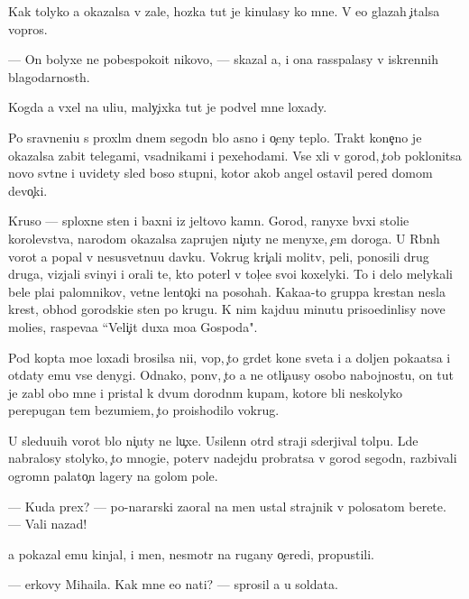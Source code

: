 \documentclass[10pt]{book}
\begin{document}
Kak tolyko {\y}a okazalsa v zale, hoz{\ia}{\y}ka tut je kinulasy ko mne. V {\y}e{\y}o glazah {\c}italsa vopros.

— On bolyxe ne pobespoko{\y}it nikovo, — skazal {\y}a, i ona rass{\yi}palasy v iskrennih blagodarnost{\ia}h.

Kogda {\y}a v{\yi}xel na uli{\q}u, maly{\c}ixka tut je podvel mne loxady.

Po sravneni{\y}u s proxl{\yi}m dnem segodn{\ia} b{\yi}lo {\y}asno i o{\c}eny teplo. Trakt kone{\c}no je okazalsa zabit telegami, vsadnikami i pexehodami. Vse xli v gorod, {\c}tob{\yi} poklonitsa novo{\y} sv{\ia}t{\yi}ne i uvidety sled boso{\y} stupni, kotor{\yi}{\y} {\y}akob{\yi} angel ostavil pered domom devo{\c}ki.

Kruso — sploxn{\yi}{\y}e sten{\yi} i baxni iz jeltovo kamn{\ia}. Gorod, ranyxe b{\yi}vxi{\y} stoli{\q}e{\y} korolevstva, narodom okazalsa zaprujen ni{\c}uty ne menyxe, {\c}em doroga. U R{\yi}bn{\yi}h vorot {\y}a popal v nesusvetnu{\y}u davku. Vokrug kri{\c}ali molitv{\yi}, peli, ponosili drug druga, vizjali svinyi i orali te, kto poter{\ia}l v tol{\c}e{\y}e svo{\y}i koxelyki. To i delo melykali bel{\yi}{\y}e pla{\x}i palomnikov, {\q}vetn{\yi}{\y}e lento{\c}ki na posohah. Kaka{\y}a-to gruppa krest{\y}an nesla krest, obhod{\ia} gorodski{\y}e sten{\yi} po krugu. K nim kajdu{\y}u minutu priso{\y}edin{\ia}lisy nov{\yi}{\y}e mol{\ia}{\x}i{\y}es{\ia}, raspeva{\y}a ``Veli{\c}it duxa mo{\y}a Gospoda".

Pod kop{\yi}ta mo{\y}e{\y} loxadi brosilsa ni{\x}i{\y}, vop{\ia}, {\c}to gr{\ia}det kone{\q} sveta i {\y}a doljen poka{\y}atsa i otdaty {\y}emu vse denygi. Odnako, pon{\ia}v, {\c}to {\y}a ne otli{\c}a{\y}usy osobo{\y} nabojnost{\y}u, on tut je zab{\yi}l obo mne i pristal k dvum dorodn{\yi}m kup{\q}am, kotor{\yi}{\y}e b{\yi}li neskolyko perepugan{\yi} tem bezumi{\y}em, {\c}to pro{\y}ishodilo vokrug.

U sledu{\y}u{\x}ih vorot b{\yi}lo ni{\c}uty ne lu{\c}xe. Usilenn{\yi}{\y} otr{\ia}d straji sderjival tolpu. L{\iu}de{\y} nabralosy stolyko, {\c}to mnogi{\y}e, poter{\ia}v nadejdu probratsa v gorod segodn{\ia}, razbivali ogromn{\yi}{\y} palato{\c}n{\yi}{\y} lagery na golom pole.

— Kuda prex? — po-nararski zaoral na men{\ia} ustal{\yi}{\y} strajnik v polosatom berete. — Vali nazad!

{\Y}a pokazal {\y}emu kinjal, i men{\ia}, nesmotr{\ia} na rugany o{\c}eredi, propustili.

— {\Q}erkovy Miha{\y}ila. Kak mne {\y}e{\y}o na{\y}ti? — sprosil {\y}a u soldata.
\end{document}
